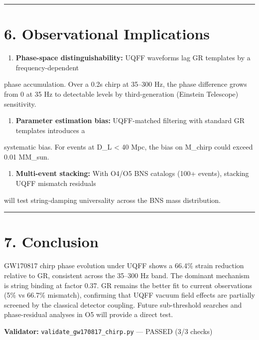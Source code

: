\documentclass[11pt]{article}
\begin{document}
\noindent\rule{\textwidth}{0.4pt}

\section*{6. Observational Implications}

\begin{enumerate}
  \item \textbf{Phase-space distinguishability:} UQFF waveforms lag GR templates by a frequency-dependent
\end{enumerate}

phase accumulation. Over a 0.2s chirp at 35--300 Hz, the phase difference grows from 0 at 35 Hz to detectable levels by third-generation (Einstein Telescope) sensitivity.

\begin{enumerate}
  \item \textbf{Parameter estimation bias:} UQFF-matched filtering with standard GR templates introduces a
\end{enumerate}

systematic bias. For events at D\_L < 40 Mpc, the bias on M\_chirp could exceed 0.01 MM\_sun.

\begin{enumerate}
  \item \textbf{Multi-event stacking:} With O4/O5 BNS catalogs (100+ events), stacking UQFF mismatch residuals
\end{enumerate}

will test string-damping universality across the BNS mass distribution.

\noindent\rule{\textwidth}{0.4pt}

\section*{7. Conclusion}

GW170817 chirp phase evolution under UQFF shows a 66.4\% strain reduction relative to GR, consistent across the 35--300 Hz band. The dominant mechanism is string binding at factor 0.37. GR remains the better fit to current observations (5\% vs 66.7\% mismatch), confirming that UQFF vacuum field effects are partially screened by the classical detector coupling. Future sub-threshold searches and phase-residual analyses in O5 will provide a direct test.

\textbf{Validator:} \verb|validate_gw170817_chirp.py| --- PASSED (3/3 checks)
\end{document}
